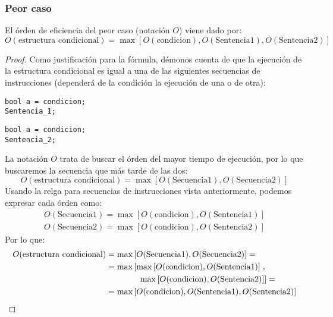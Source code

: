\subsubsection{Peor caso}
El órden de eficiencia del peor caso (notación $O$) viene dado por:
\begin{equation*}
O(\text{estructura condicional}) = \max\left[O(\text{condicion}), O(\text{Sentencia1}), O(\text{Sentencia2})\right]
\end{equation*}
\begin{proof}
Como justificación para la fórmula, démonos cuenta de que la ejecución de la estructura condicional es igual a una de las siguientes secuencias de instrucciones (dependerá de la condición la ejecución de una o de otra):

\begin{minipage}{0.5\textwidth}
\begin{listing}[H]
    \begin{verbatim}
bool a = condicion;
Sentencia_1;
    \end{verbatim}
\end{listing}
\end{minipage}
\begin{minipage}{0.5\textwidth}
\begin{listing}[H]
    \begin{verbatim}
bool a = condicion;
Sentencia_2;
    \end{verbatim}
\end{listing}
\end{minipage}

La notación $O$ trata de buscar el órden del mayor tiempo de ejecución, por lo que buscaremos la secuencia que más tarde de las dos:
\begin{equation*}
O(\text{estructura condicional}) = \max\left[O(\text{Secuencia1}), O(\text{Secuencia2})\right]
\end{equation*}
Usando la relga para secuencias de instrucciones vista anteriormente, podemos expresar cada órden como:
\begin{gather*}
O(\text{Secuencia1}) = \max\left[O(\text{condicion}), O(\text{Sentencia1})\right]\\
O(\text{Secuencia2}) = \max\left[O(\text{condicion}), O(\text{Sentencia2})\right]
\end{gather*}
Por lo que:
\begin{align*}
O(\text{estructura condicional}) &= \max\left[O(\text{Secuencia1}), O(\text{Secuencia2})\right] = \\
                                 &= \max\left[\max\left[O(\text{condicion}), O(\text{Sentencia1})\right]\right.,\\
                                 & \hspace{1.35cm} \left.\max\left[O(\text{condicion}), O(\text{Sentencia2})\right]\right] =\\
                                 &= \max\left[O(\text{condicion}), O(\text{Sentencia1}), O(\text{Sentencia2})\right]
\end{align*}
\end{proof}

